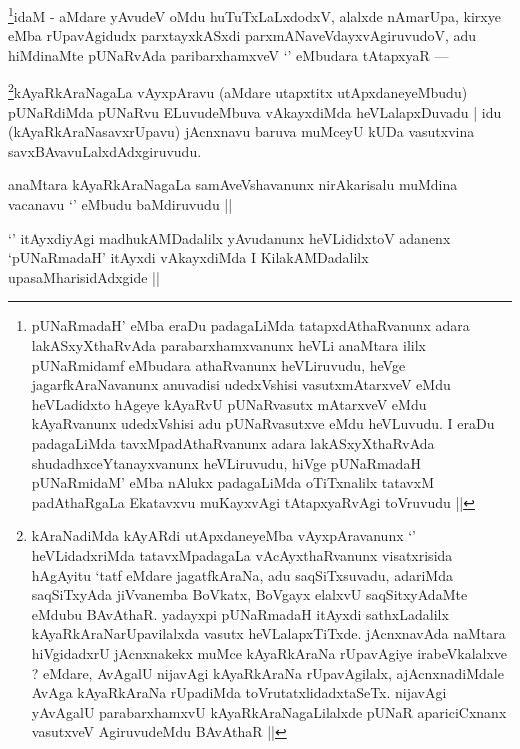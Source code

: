 
\begin{artha}
\footnote{pUNaRmadaH' eMba eraDu padagaLiMda tatapxdAthaRvanunx adara lakASxyXthaRvAda parabarxhamxvanunx heVLi anaMtara ililx pUNaRmidamf eMbudara athaRvanunx heVLiruvudu, heVge jagarfkAraNavanunx anuvadisi udedxVshisi vasutxmAtarxveV eMdu heVLadidxto hAgeye kAyaRvU pUNaRvasutx mAtarxveV eMdu kAyaRvanunx udedxVshisi adu pUNaRvasutxve eMdu heVLuvudu. I eraDu padagaLiMda tavxMpadAthaRvanunx adara lakASxyXthaRvAda shudadhxceYtanayxvanunx heVLiruvudu, hiVge pUNaRmadaH pUNaRmidaM' eMba nAlukx padagaLiMda oTiTxnalilx tatavxM padAthaRgaLa Ekatavxvu muKayxvAgi tAtapxyaRvAgi toVruvudu ||}idaM - aMdare yAvudeV oMdu huTuTxLaLxdodxV, alalxde nAmarUpa, kirxye eMba rUpavAgidudx parxtayxkASxdi parxmANaveVdayxvAgiruvudoV, adu hiMdinaMte pUNaRvAda paribarxhamxveV `\stext' eMbudara tAtapxyaR ---
\end{artha}

\begin{artha}
\footnote{kAraNadiMda kAyARdi utApxdaneyeMba vAyxpAravanunx `\stext' heVLidadxriMda tatavxMpadagaLa vAcAyxthaRvanunx visatxrisida hAgAyitu `tatf eMdare jagatfkAraNa, adu saqSiTxsuvadu, adariMda saqSiTxyAda jiVvanemba BoVkatx, BoVgayx elalxvU saqSitxyAdaMte eMdubu BAvAthaR. yadayxpi pUNaRmadaH itAyxdi sathxLadalilx kAyaRkAraNarUpavilalxda vasutx heVLalapxTiTxde. jAcnxnavAda naMtara hiVgidadxrU jAcnxnakekx muMce kAyaRkAraNa rUpavAgiye irabeVkalalxve ? eMdare, AvAgalU nijavAgi kAyaRkAraNa rUpavAgilalx, ajAcnxnadiMdale AvAga kAyaRkAraNa rUpadiMda toVrutatxlidadxtaSeTx. nijavAgi yAvAgalU parabarxhamxvU kAyaRkAraNagaLilalxde pUNaR apariciCxnanx vasutxveV AgiruvudeMdu BAvAthaR ||}kAyaRkAraNagaLa vAyxpAravu (aMdare utapxtitx utApxdaneyeMbudu) pUNaRdiMda pUNaRvu ELuvudeMbuva vAkayxdiMda heVLalapxDuvadu | idu (kAyaRkAraNasavxrUpavu) jAcnxnavu baruva muMceyU kUDa vasutxvina savxBAvavuLalxdAdxgiruvudu.
\end{artha}


\begin{artha}
anaMtara kAyaRkAraNagaLa samAveVshavanunx nirAkarisalu muMdina vacanavu `\stext' eMbudu baMdiruvudu ||
\end{artha}

\begin{artha}
`\stext' itAyxdiyAgi madhukAMDadalilx yAvudanunx heVLididxtoV adanenx `pUNaRmadaH' itAyxdi vAkayxdiMda I KilakAMDadalilx upasaMharisidAdxgide ||
\end{artha}

